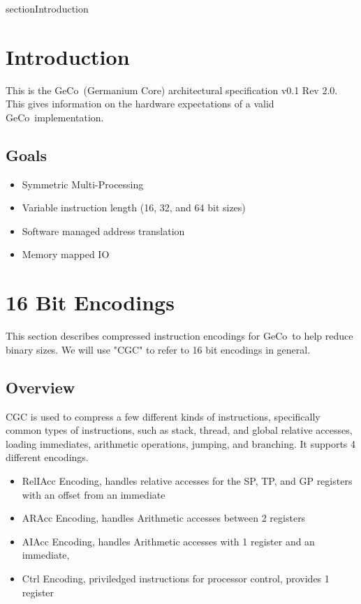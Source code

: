 \documentclass[6pt]{article}
\title{\name}
\author{Lilly Anderson}
\def\version{0.1 Rev 2.0}
\def\name{Germanium Core}
\def\sname{GeCo}
\begin{document}
\maketitle

\pagebreak
\tableofcontents

\pagebreak
{}
{section}{Introduction}
\section*{Introduction}
This is the \sname\ (\name) architectural specification v\version. This gives information on the hardware expectations of a valid \sname\ implementation.

\subsection{Goals}
\begin{itemize}
    \item Symmetric Multi-Processing
    \item Variable instruction length (16, 32, and 64 bit sizes)
    \item Software managed address translation
    \item Memory mapped IO
\end{itemize}

\section{16 Bit Encodings}
This section describes compressed instruction encodings for \sname\ to help reduce binary sizes. We will use "CGC" to refer to 16 bit encodings in general.

\subsection{Overview}
CGC is used to compress a few different kinds of instructions, specifically common types of instructions, such as stack, thread, and global relative accesses, loading immediates, arithmetic operations, jumping, and branching. It supports 4 different encodings.
\begin{itemize}
    \item RelIAcc Encoding, handles relative accesses for the SP, TP, and GP registers with an offset from an immediate
    \item ARAcc Encoding, handles Arithmetic accesses between 2 registers
    \item AIAcc Encoding, handles Arithmetic accesses with 1 register and an immediate,
    \item Ctrl Encoding, priviledged instructions for processor control, provides 1 register
\end{itemize}
\end{document}
